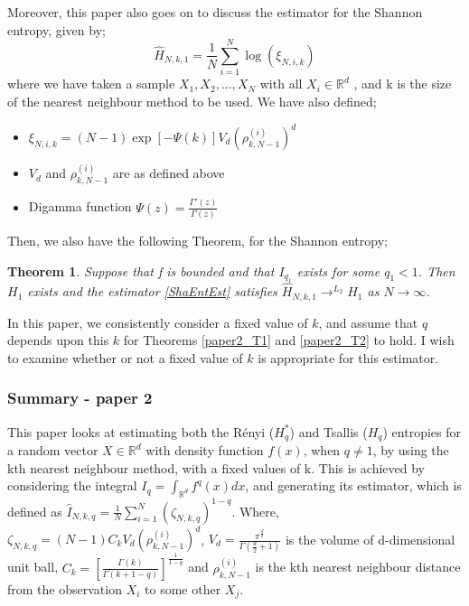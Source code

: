 \documentclass{article}
\newtheorem{theorem}{Theorem}
\begin{document}
Moreover, this paper also goes on to discuss the estimator for the Shannon entropy, given by;
\begin{equation} \label{ShaEntEst}
\hat{H}_{N, k, 1} = \frac{1}{N} \sum_{i=1}^{N} \log (\xi_{N, i, k})
\end{equation}
where we have taken a sample $X_{1}, X_{2}, ..., X_{N}$ with all $X_{i} \in \mathbb{R}^{d}$ , and k is the size of the nearest neighbour method to be used. We have also defined;
\begin{itemize}
\item $\xi_{N, i, k} = (N-1)\exp[-\Psi(k)]V_{d}(\rho_{k, N-1}^{(i)})^{d}$
\item $V_{d}$ and $\rho_{k, N-1}^{(i)}$ are as defined above
\item Digamma function $\Psi(z) = \frac{\Gamma'(z)}{\Gamma(z)}$
\end{itemize}
Then, we also have the following Theorem, for the Shannon entropy;
\begin{theorem} \label{paper2_T3}
Suppose that f is bounded and that $I_{q_{1}}$ exists for some $q_{1} < 1$. Then $H_{1}$ exists and the estimator \ref{ShaEntEst} satisfies $\hat{H}_{N, k, 1} \to^{L_{2}} H_{1}$ as $N \to \infty$.
\end{theorem}

In this paper, we consistently consider a fixed value of $k$, and assume that $q$ depends upon this $k$ for Theorems \ref{paper2_T1} and \ref{paper2_T2} to hold. I wish to examine whether or not a fixed value of $k$ is appropriate for this estimator.

\subsubsection{Summary - paper 2}

This paper looks at estimating both the R\'enyi ($H_{q}^{*}$) and Tsallis ($H_{q}$) entropies for a random vector $X \in \mathbb{R}^d$ with density function $f(x)$, when $q \neq 1$, by using the kth nearest neighbour method, with a fixed values of k. This is achieved by considering the integral  $I_{q} = \int_{\mathbb{R}^d} f^q (x) dx$, and generating its estimator, which is defined as $\hat{I}_{N, k, q} = \frac{1}{N} \sum_{i=1}^{N} (\zeta_{N, k, q})^{1-q}$. Where, $\zeta_{N, k ,q} = (N-1)C_{k}V_{d}(\rho_{k, N-1}^{(i)})^d$,  $V_{d} = \frac{\pi^{\frac{d}{2}}}{\Gamma(\frac{d}{2} + 1 )}$ is the volume of d-dimensional unit ball, $C_{k} = \left[ \frac{\Gamma(k)}{\Gamma(k+1-q)} \right]^{\frac{1}{1-q}}$ and $\rho_{k, N-1}^{(i)}$ is the kth nearest neighbour distance from the observation $X_{i}$ to some other $X_{j}$.
\end{document}
